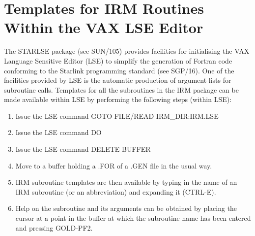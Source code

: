 \section {Templates for IRM Routines Within the VAX LSE Editor}
The STARLSE package (see SUN/105) provides facilities for initialising the VAX
Language Sensitive Editor (LSE) to simplify the generation of Fortran
code conforming to the Starlink programming standard (see SGP/16). One of the
facilities provided by LSE is the automatic production of argument lists for
subroutine calls. Templates for all the subroutines in the IRM package can be
made available within LSE by performing the following steps (within LSE):
\begin{enumerate}
\item Issue the LSE command GOTO FILE/READ IRM\_DIR:IRM.LSE
\item Issue the LSE command DO
\item Issue the LSE command DELETE BUFFER
\item Move to a buffer holding a .FOR of a .GEN file in the usual way.
\item IRM subroutine templates are then available by typing in the name of an
IRM subroutine (or an abbreviation) and expanding it (CTRL-E).
\item Help on the subroutine and its arguments can be obtained by placing the
cursor at a point in the buffer at which the subroutine name has been entered
and pressing GOLD-PF2.
\end{enumerate}

